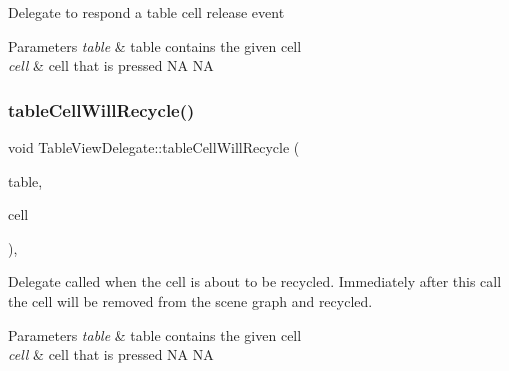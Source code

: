 Delegate to respond a table cell release event


\begin{DoxyParams}{Parameters}
{\em table} & table contains the given cell \\
\hline
{\em cell} & cell that is pressed  NA  NA \\
\hline
\end{DoxyParams}
\mbox{\label{classTableViewDelegate_a0cd137a593de1be843739d3e85a698a9}} 
\subsubsection{\texorpdfstring{table\+Cell\+Will\+Recycle()}{tableCellWillRecycle()}\hspace{0.1cm}{\footnotesize\ttfamily [1/2]}}
{\footnotesize\ttfamily void Table\+View\+Delegate\+::table\+Cell\+Will\+Recycle (\begin{DoxyParamCaption}\item[{\hyperlink{classTableView}{Table\+View} $\ast$}]{table,  }\item[{\hyperlink{classTableViewCell}{Table\+View\+Cell} $\ast$}]{cell }\end{DoxyParamCaption})\hspace{0.3cm}{\ttfamily [inline]}, {\ttfamily [virtual]}}

Delegate called when the cell is about to be recycled. Immediately after this call the cell will be removed from the scene graph and recycled.


\begin{DoxyParams}{Parameters}
{\em table} & table contains the given cell \\
\hline
{\em cell} & cell that is pressed  NA  NA \\
\hline
\end{DoxyParams}
\mbox{\label{classTableViewDelegate_a0e3448877cb9cd45ec442ba91f20933d}} 
